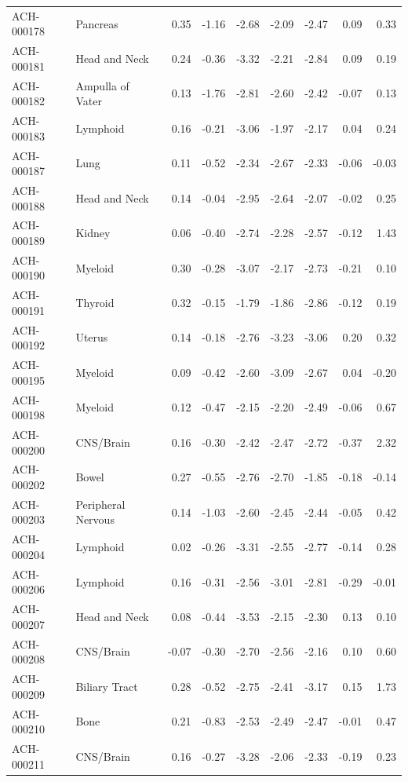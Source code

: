 \begin{footnotesize}
\begin{longtable}{llrrrrrrr}
ACH-000178 & Pancreas & 0.35 & -1.16 & -2.68 & -2.09 & -2.47 & 0.09 & 0.33 \\
ACH-000181 & Head and Neck & 0.24 & -0.36 & -3.32 & -2.21 & -2.84 & 0.09 & 0.19 \\
ACH-000182 & Ampulla of Vater & 0.13 & -1.76 & -2.81 & -2.60 & -2.42 & -0.07 & 0.13 \\
ACH-000183 & Lymphoid & 0.16 & -0.21 & -3.06 & -1.97 & -2.17 & 0.04 & 0.24 \\
ACH-000187 & Lung & 0.11 & -0.52 & -2.34 & -2.67 & -2.33 & -0.06 & -0.03 \\
ACH-000188 & Head and Neck & 0.14 & -0.04 & -2.95 & -2.64 & -2.07 & -0.02 & 0.25 \\
ACH-000189 & Kidney & 0.06 & -0.40 & -2.74 & -2.28 & -2.57 & -0.12 & 1.43 \\
ACH-000190 & Myeloid & 0.30 & -0.28 & -3.07 & -2.17 & -2.73 & -0.21 & 0.10 \\
ACH-000191 & Thyroid & 0.32 & -0.15 & -1.79 & -1.86 & -2.86 & -0.12 & 0.19 \\
ACH-000192 & Uterus & 0.14 & -0.18 & -2.76 & -3.23 & -3.06 & 0.20 & 0.32 \\
ACH-000195 & Myeloid & 0.09 & -0.42 & -2.60 & -3.09 & -2.67 & 0.04 & -0.20 \\
ACH-000198 & Myeloid & 0.12 & -0.47 & -2.15 & -2.20 & -2.49 & -0.06 & 0.67 \\
ACH-000200 & CNS/Brain & 0.16 & -0.30 & -2.42 & -2.47 & -2.72 & -0.37 & 2.32 \\
ACH-000202 & Bowel & 0.27 & -0.55 & -2.76 & -2.70 & -1.85 & -0.18 & -0.14 \\
ACH-000203 & Peripheral Nervous & 0.14 & -1.03 & -2.60 & -2.45 & -2.44 & -0.05 & 0.42 \\
ACH-000204 & Lymphoid & 0.02 & -0.26 & -3.31 & -2.55 & -2.77 & -0.14 & 0.28 \\
ACH-000206 & Lymphoid & 0.16 & -0.31 & -2.56 & -3.01 & -2.81 & -0.29 & -0.01 \\
ACH-000207 & Head and Neck & 0.08 & -0.44 & -3.53 & -2.15 & -2.30 & 0.13 & 0.10 \\
ACH-000208 & CNS/Brain & -0.07 & -0.30 & -2.70 & -2.56 & -2.16 & 0.10 & 0.60 \\
ACH-000209 & Biliary Tract & 0.28 & -0.52 & -2.75 & -2.41 & -3.17 & 0.15 & 1.73 \\
ACH-000210 & Bone & 0.21 & -0.83 & -2.53 & -2.49 & -2.47 & -0.01 & 0.47 \\
ACH-000211 & CNS/Brain & 0.16 & -0.27 & -3.28 & -2.06 & -2.33 & -0.19 & 0.23 \\

\end{longtable}
\end{footnotesize}
